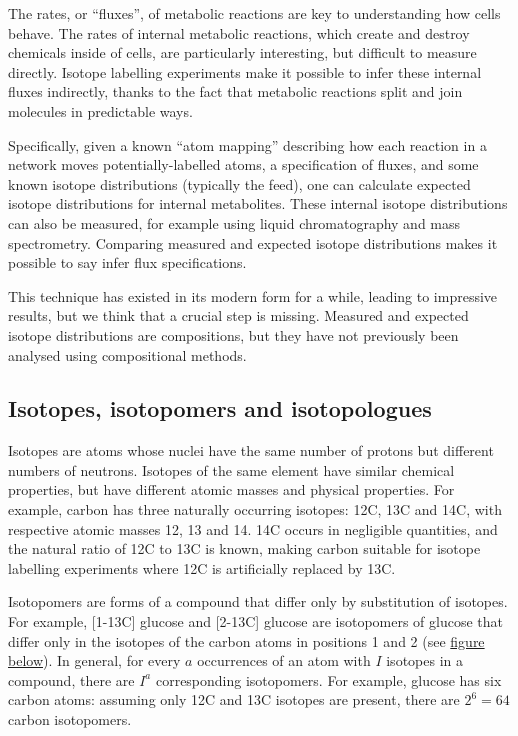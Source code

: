 \documentclass{article}
\begin{document}
The rates, or ``fluxes'', of metabolic reactions are key to
understanding how cells behave. The rates of internal metabolic
reactions, which create and destroy chemicals inside of cells, are
particularly interesting, but difficult to measure directly. Isotope
labelling experiments make it possible to infer these internal fluxes
indirectly, thanks to the fact that metabolic reactions split and join
molecules in predictable ways.

Specifically, given a known ``atom mapping'' describing how each
reaction in a network moves potentially-labelled atoms, a specification
of fluxes, and some known isotope distributions (typically the feed),
one can calculate expected isotope distributions for internal
metabolites. These internal isotope distributions can also be measured,
for example using liquid chromatography and mass spectrometry. Comparing
measured and expected isotope distributions makes it possible to say
infer flux specifications.

This technique has existed in its modern form for a while, leading to
impressive results, but we think that a crucial step is missing.
Measured and expected isotope distributions are compositions, but they
have not previously been analysed using compositional methods.

\subsection{Isotopes, isotopomers and
isotopologues}\label{isotopes-isotopomers-and-isotopologues}

Isotopes are atoms whose nuclei have the same number of protons but
different numbers of neutrons. Isotopes of the same element have similar
chemical properties, but have different atomic masses and physical
properties. For example, carbon has three naturally occurring isotopes:
12C, 13C and 14C, with respective atomic masses 12, 13 and 14. 14C
occurs in negligible quantities, and the natural ratio of 12C to 13C is
known, making carbon suitable for isotope labelling experiments where
12C is artificially replaced by 13C.

Isotopomers are forms of a compound that differ only by substitution of
isotopes. For example, {[}1-13C{]} glucose and {[}2-13C{]} glucose are
isotopomers of glucose that differ only in the isotopes of the carbon
atoms in positions 1 and 2 (see \hyperref[glucose]{figure below}). In
general, for every \(a\) occurrences of an atom with \(I\) isotopes in a
compound, there are \(I^a\) corresponding isotopomers. For example,
glucose has six carbon atoms: assuming only 12C and 13C isotopes are
present, there are \(2^6=64\) carbon isotopomers.
\end{document}

